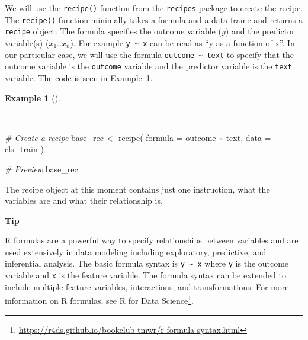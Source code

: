 \documentclass[
  letterpaper,
  DIV=11,
  numbers=noendperiod]{scrreprt}
\newenvironment{Shaded}{\begin{snugshade}}{\end{snugshade}}
\newcommand{\AttributeTok}[1]{\textcolor[rgb]{0.00,0.00,0.00}{#1}}
\newcommand{\CommentTok}[1]{\textcolor[rgb]{0.00,0.00,0.00}{\textit{#1}}}
\newcommand{\FunctionTok}[1]{\textcolor[rgb]{0.00,0.00,0.00}{#1}}
\newcommand{\NormalTok}[1]{\textcolor[rgb]{0.00,0.00,0.00}{#1}}
\newcommand{\OtherTok}[1]{\textcolor[rgb]{0.00,0.00,0.00}{#1}}
\newcommand{\SpecialCharTok}[1]{\textcolor[rgb]{0.00,0.00,0.00}{#1}}
\theoremstyle{definition}
\newtheorem{example}{Example}[chapter]
\theoremstyle{remark}
\DeclareRobustCommand{\href}[2]{#2\footnote{\url{#1}}}
\begin{document}
We will use the \texttt{recipe()} function from the \texttt{recipes}
package to create the recipe. The \texttt{recipe()} function minimally
takes a formula and a data frame and returns a \texttt{recipe} object.
The formula specifies the outcome variable (\(y\)) and the predictor
variable(s) (\(x_1 .. x_n\)). For example
\texttt{y\ \textasciitilde{}\ x} can be read as ``y as a function of
x''. In our particular case, we will use the formula
\texttt{outcome\ \textasciitilde{}\ text} to specify that the outcome
variable is the \texttt{outcome} variable and the predictor variable is
the \texttt{text} variable. The code is seen in
Example~\ref{exm-pda-class-recipe}.

\begin{example}[]\protect\hypertarget{exm-pda-class-recipe}{}\label{exm-pda-class-recipe}

~

\begin{Shaded}
\begin{Highlighting}[]
\CommentTok{\# Create a recipe}
\NormalTok{base\_rec }\OtherTok{\textless{}{-}}
  \FunctionTok{recipe}\NormalTok{(}
    \AttributeTok{formula =}\NormalTok{ outcome }\SpecialCharTok{\textasciitilde{}}\NormalTok{ text,}
    \AttributeTok{data =}\NormalTok{ cls\_train}
\NormalTok{    )}

\CommentTok{\# Preview}
\NormalTok{base\_rec}
\end{Highlighting}
\end{Shaded}

\end{example}

The recipe object at this moment contains just one instruction, what the
variables are and what their relationship is.

\begin{tcolorbox}[enhanced jigsaw, leftrule=.75mm, colframe=quarto-callout-color-frame, colback=white, rightrule=.15mm, opacityback=0, arc=.35mm, breakable, bottomrule=.15mm, left=2mm, toprule=.15mm]

\textbf{ Tip}

R formulas are a powerful way to specify relationships between variables
and are used extensively in data modeling including exploratory,
predictive, and inferential analysis. The basic formula syntax is
\texttt{y\ \textasciitilde{}\ x} where \texttt{y} is the outcome
variable and \texttt{x} is the feature variable. The formula syntax can
be extended to include multiple feature variables, interactions, and
transformations. For more information on R formulas, see
\href{https://r4ds.github.io/bookclub-tmwr/r-formula-syntax.html}{R for
Data Science}.

\end{tcolorbox}
\end{document}
